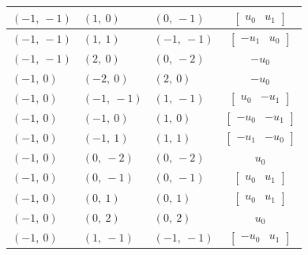 \documentclass[11pt]{article}
\theoremstyle{definition}
\begin{document}
\begin{longtable}{|l|l|l|c|}
    \hline
    $\left( -1, \  -1\right)$ & $\left( 1, \  0\right)$ & $\left( 0, \  -1\right)$ & $\left[\begin{matrix}u_{0} & u_{1}\end{matrix}\right]$ \\
    \hline
    $\left( -1, \  -1\right)$ & $\left( 1, \  1\right)$ & $\left( -1, \  -1\right)$ & $\left[\begin{matrix}- u_{1} & u_{0}\end{matrix}\right]$ \\
    \hline
    $\left( -1, \  -1\right)$ & $\left( 2, \  0\right)$ & $\left( 0, \  -2\right)$ & $- u_{0}$ \\
    \hline
    $\left( -1, \  0\right)$ & $\left( -2, \  0\right)$ & $\left( 2, \  0\right)$ & $- u_{0}$ \\
    \hline
    $\left( -1, \  0\right)$ & $\left( -1, \  -1\right)$ & $\left( 1, \  -1\right)$ & $\left[\begin{matrix}u_{0} & - u_{1}\end{matrix}\right]$ \\
    \hline
    $\left( -1, \  0\right)$ & $\left( -1, \  0\right)$ & $\left( 1, \  0\right)$ & $\left[\begin{matrix}- u_{0} & - u_{1}\end{matrix}\right]$ \\
    \hline
    $\left( -1, \  0\right)$ & $\left( -1, \  1\right)$ & $\left( 1, \  1\right)$ & $\left[\begin{matrix}- u_{1} & - u_{0}\end{matrix}\right]$ \\
    \hline
    $\left( -1, \  0\right)$ & $\left( 0, \  -2\right)$ & $\left( 0, \  -2\right)$ & $u_{0}$ \\
    \hline
    $\left( -1, \  0\right)$ & $\left( 0, \  -1\right)$ & $\left( 0, \  -1\right)$ & $\left[\begin{matrix}u_{0} & u_{1}\end{matrix}\right]$ \\
    \hline
    $\left( -1, \  0\right)$ & $\left( 0, \  1\right)$ & $\left( 0, \  1\right)$ & $\left[\begin{matrix}u_{0} & u_{1}\end{matrix}\right]$ \\
    \hline
    $\left( -1, \  0\right)$ & $\left( 0, \  2\right)$ & $\left( 0, \  2\right)$ & $u_{0}$ \\
    \hline
    $\left( -1, \  0\right)$ & $\left( 1, \  -1\right)$ & $\left( -1, \  -1\right)$ & $\left[\begin{matrix}- u_{0} & u_{1}\end{matrix}\right]$ \\

\end{longtable}
\end{document}
